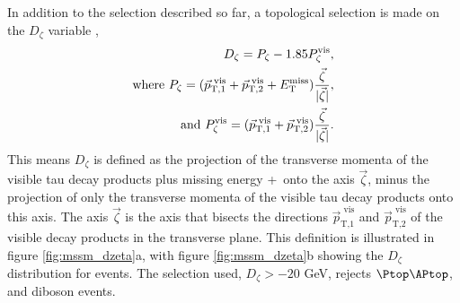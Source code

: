 In addition to the selection described so far,
 a topological selection is made on the $D_{\zeta}$ variable \cite{cdf-dzeta},
\begin{align}\label{eqn:mssm_em_dzeta}
D_{\zeta} = P_{\zeta} - 1.85 P_{\zeta}^{\text{vis}}, \notag \\
\text{where } P_{\zeta} = (\vec{p}_{\text{T},1}^{\text{  vis}} + \vec{p}_{\text{T},2}^{\text{  vis}} + E_{\text{T}}^{\text{miss}})\frac{\vec{\zeta}}{|\vec{\zeta}|}, \notag \\
\text{and } P_{\zeta}^{\text{vis}} = (\vec{p}_{\text{T},1}^{\text{  vis}}+\vec{p}_{\text{T},2}^{\text{  vis}})\frac{\vec{\zeta}}{|\vec{\zeta}|}.
\end{align}
This means $D_{\zeta}$ is defined as the projection of the transverse momenta of the visible tau decay products plus missing energy \pT+\MET~onto 
the axis $\vec{\zeta}$, minus the projection of only the transverse momenta of the visible tau decay products onto this axis.
The axis $\vec{\zeta}$ is the axis that bisects
the directions $\vec{p}_{\text{T,1}}^{\text{  vis}}$ and $\vec{p}_{\text{T,2}}^{\text{  vis}}$
of the visible decay products in the transverse plane. This definition is illustrated in figure
\ref{fig:mssm_dzeta}a, with figure \ref{fig:mssm_dzeta}b showing the $D_{\zeta}$ distribution
for \emu events. The selection used, $D_{\zeta} > -20$ GeV, rejects $\ttbar$, \Wjets and diboson
events. 

